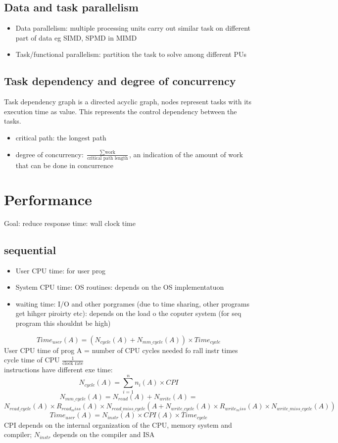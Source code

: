 \documentclass{article}
\begin{document}
\subsection{Data and task parallelism}
\begin{itemize}
    \item Data parallelism: multiple processing units carry out similar task on different part of data eg SIMD, SPMD in MIMD
    \item Task/functional parallelism: partition the task to solve among different PUs
\end{itemize}
\subsection{Task dependency and degree of concurrency}
Task dependency graph is a directed acyclic graph, nodes represent tasks with its execution time as value. This represents the control
dependency between the tasks. 
\begin{itemize}
    \item critical path: the longest path 
    \item degree of concurrency: $\frac{\sum \text{work}}{\text{critical path length}}$, an  indication of the amount of work that can be done in concurrence
\end{itemize}

\section{Performance}
Goal: reduce response time: wall clock time
\subsection{sequential}

\begin{itemize}
    \item User CPU time: for user prog
    \item System CPU time: OS routines: depends on the OS implementatuon 
    \item waiting time: I/O and other porgrames (due to time sharing, other programs get hihger piroirty etc): depends on the load o the coputer system (for seq program this shouldnt be high)
\end{itemize}
\[Time_{user}(A) =\left( N_{cycle}(A) + N_{mm\_cycle}(A)\right)\times Time_{cycle}\]
User CPU time of prog A = number of CPU cycles needed fo rall instr times cycle time of CPU $\frac{1}{\text{clock rate}}$\\
instructions have different exe time: 
\[N_{cycle}(A) = \sum_{i=1}^{n}n_i(A)\times CPI\]
\[ N_{mm\_cycle}(A) = N_{read}(A) + N_{write}(A) = \]\[N_{read\_cycle}(A) \times R_{read_miss}(A) \times N_{read\_miss\_cycle}(A + 
N_{write\_cycle}(A) \times R_{write_miss}(A) \times N_{write\_miss\_cycle}(A))\]
\[Time_{user}(A) = N_{instr}(A) \times CPI(A) \times Time_{cycle}\]
CPI depends on the internal organization of the CPU, memory system and compiler; $N_{instr}$ depends on the compiler and ISA\\
\end{document}
